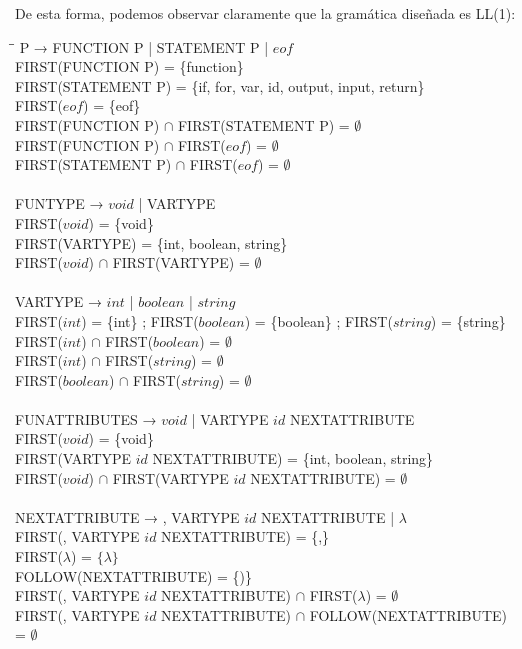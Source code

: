 De esta forma, podemos observar claramente que la gramática diseñada es LL(1):
\begin{tabbing}
    \hspace{1cm}\=\hspace{2cm}\=\kill
    P → FUNCTION P | STATEMENT P | $eof$\\
    \> FIRST(FUNCTION P) = \{function\}\\
    \> FIRST(STATEMENT P) = \{if, for, var, id, output, input, return\}\\
    \> FIRST($eof$) = \{eof\}\\
    \> \> FIRST(FUNCTION P) $\cap$ FIRST(STATEMENT P) = $\emptyset$\\
    \> \> FIRST(FUNCTION P) $\cap$ FIRST($eof$) = $\emptyset$\\
    \> \> FIRST(STATEMENT P) $\cap$ FIRST($eof$) = $\emptyset$\\
    \\
    FUNTYPE → $void$ | VARTYPE\\
    \> FIRST($void$) = \{void\}\\
    \> FIRST(VARTYPE) = \{int, boolean, string\}\\
    \> \> FIRST($void$) $\cap$ FIRST(VARTYPE) = $\emptyset$\\
    \\
    VARTYPE → $int$ | $boolean$ | $string$\\
    \> FIRST($int$) = \{int\} ; FIRST($boolean$) = \{boolean\} ; FIRST($string$) = \{string\}\\
    \> \> FIRST($int$) $\cap$ FIRST($boolean$) = $\emptyset$\\
    \> \> FIRST($int$) $\cap$ FIRST($string$) = $\emptyset$\\
    \> \> FIRST($boolean$) $\cap$ FIRST($string$) = $\emptyset$\\
    \\
    FUNATTRIBUTES → $void$ | VARTYPE $id$ NEXTATTRIBUTE\\
    \> FIRST($void$) = \{void\}\\
    \> FIRST(VARTYPE $id$ NEXTATTRIBUTE) = \{int, boolean, string\}\\
    \> \> FIRST($void$) $\cap$ FIRST(VARTYPE $id$ NEXTATTRIBUTE) = $\emptyset$\\
    \\
    NEXTATTRIBUTE → , VARTYPE $id$ NEXTATTRIBUTE | $\lambda$\\
    \> FIRST(, VARTYPE $id$ NEXTATTRIBUTE) = \{,\}\\
    \> FIRST($\lambda$) = $\{\lambda\}$\\
    \> FOLLOW(NEXTATTRIBUTE) = \{)\}\\
    \> \> FIRST(, VARTYPE $id$ NEXTATTRIBUTE) $\cap$ FIRST($\lambda$) = $\emptyset$\\
    \> \> FIRST(, VARTYPE $id$ NEXTATTRIBUTE) $\cap$ FOLLOW(NEXTATTRIBUTE) = $\emptyset$\\
\end{tabbing}

